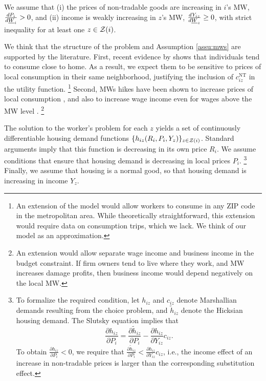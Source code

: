 \begin{assu}\label{assu:mws}
    We assume that
    (i) the prices of non-tradable goods are increasing in $i$'s MW, 
    $\frac{d P_i}{d \underline{W}_i} > 0$, and
    (ii) income is weakly increasing in $z$'s MW, 
    $\frac{d Y_{iz}}{d \underline{W}_z} \geq 0$, with strict inequality 
    for at least one $z\in\mathcal{Z}(i)$.
\end{assu}

We think that the structure of the problem and
Assumption \ref{assu:mws} are supported by the literature.
First, recent evidence by \textcite{MiyauchiEtAl2021} shows that individuals tend 
to consume close to home.
As a result, we expect them to be sensitive to prices of local consumption in their 
same neighborhood, justifying the inclusion of $c^{\text{NT}}_{iz}$ in the utility
function.%
\footnote{An extension of the model would allow workers to consume in any ZIP code
in the metropolitan area.
While theoretically straightforward, this extension would require data on consumption
trips, which we lack.
We think of our model as an approximation.}
Second, MWs hikes have been shown to increase prices of local consumption 
\parencite[e.g.,][]{AllegrettoReich2018, Leung2021},
and also to increase wage income even for wages above the MW 
level \parencite[e.g.,][]{CegnizEtAl2019}.%
\footnote{An extension would allow separate wage income and business income in 
the budget constraint.
If firm owners tend to live where they work, and MW increases damage profits,
then business income would depend negatively on the local MW.}

The solution to the worker's problem for each $z$ yields a set of continuously 
differentiable housing demand functions 
$\{h_{iz} (R_i, P_i, Y_z)\}_{z\in\mathcal{Z}(i)}$.
Standard arguments imply that this function is decreasing in its own price $R_i$.
We assume conditions that ensure that housing demand is decreasing in local 
prices $P_i$.%
\footnote{To formalize the required condition, let $h_{iz}$ and $c_{iz}$ denote 
Marshallian demands resulting from the choice problem, and $\tilde h_{iz}$ 
denote the Hicksian housing demand.
The Slutsky equation implies that
$$\frac{\partial h_{iz}}{\partial P_i} 
   = \frac{\partial \tilde h_{iz}}{\partial P_i} 
   - \frac{\partial h_{iz}}{\partial Y_{iz}} c_{iz}.$$
To obtain $\frac{\partial h_{iz}}{\partial P_i} < 0$, we require that 
$\frac{\partial \tilde h_{iz}}{\partial P_i} 
< \frac{\partial h_{iz}}{\partial Y_{iz}} c_{iz}$, i.e., the income effect of an 
increase in non-tradable prices is larger than the corresponding substitution 
effect.}
Finally, we assume that housing is a normal good, so that housing demand is 
increasing in income $Y_z$.

